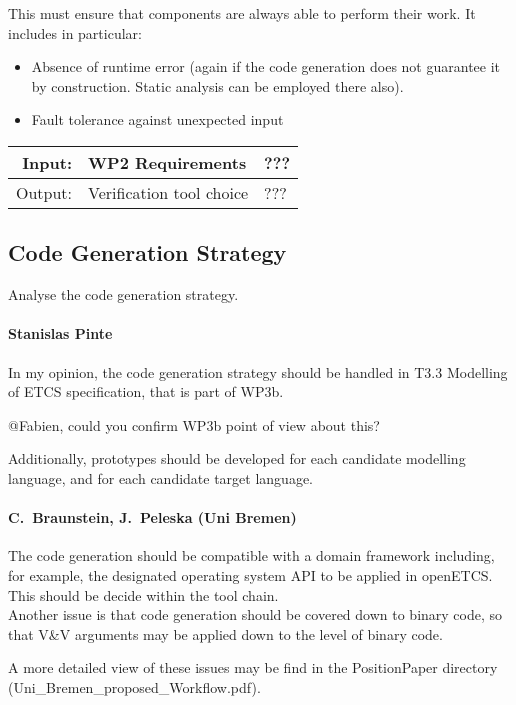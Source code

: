 \documentclass[11pt, a4paper]{article}
\newenvironment{inoutput}
{\vspace{2mm}
\noindent
\begin{tabular}{|r|p{.7\linewidth}|l|}
\hline}
{
\hline
\end{tabular}}
\begin{document}
This must ensure that components are always able to perform their work.
It includes in particular:
\begin{itemize}
  \item Absence of runtime error (again if the code generation does
        not guarantee it by construction. Static analysis can be employed
        there also).
  \item Fault tolerance against unexpected input
\end{itemize}

\begin{inoutput}
Input: & WP2 Requirements & ??? \\
\hline
Output: & Verification tool choice & ??? \\
\end{inoutput}


\subsection{Code Generation Strategy}

Analyse the code generation strategy.

\paragraph{Stanislas Pinte}
In my opinion, the code generation strategy should be handled in T3.3 Modelling of ETCS specification, that is part of WP3b.

@Fabien, could you confirm WP3b point of view about this?

Additionally, prototypes should be developed for each candidate modelling language, and for each candidate target language.
\paragraph{C.~Braunstein, J.~Peleska (Uni Bremen)}
The code generation should be compatible with a domain framework including, for
example, the designated operating system API to be applied in openETCS. This
should be decide within the tool chain. \\
Another issue is that code generation should be covered down to binary code, so that V\&V arguments
may be applied down to the level of binary code.

A more detailed view of these issues may be find in the PositionPaper directory
(Uni\_Bremen\_proposed\_Workflow.pdf).\\
\end{document}
